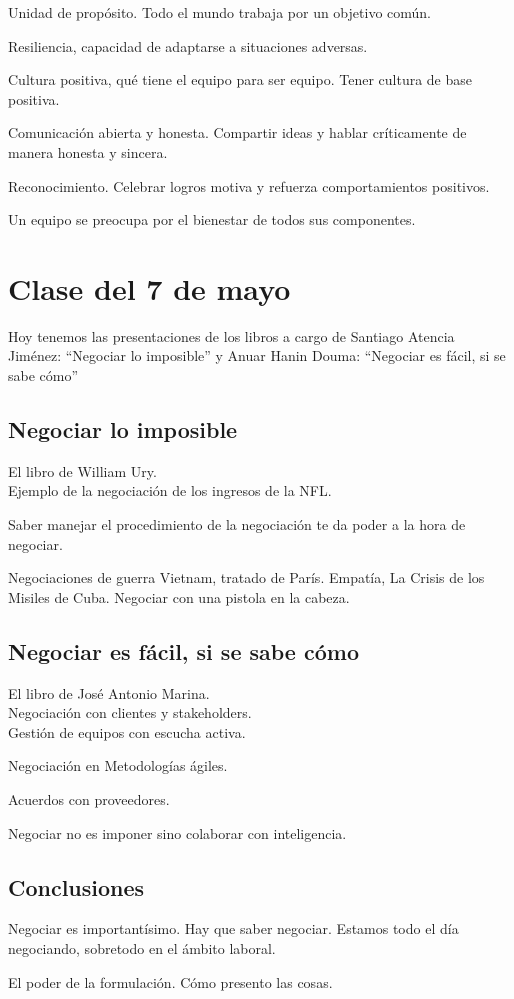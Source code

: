 \documentclass[12pt, a4paper, twoside]{article}
\begin{document}
Unidad de propósito. Todo el mundo trabaja por un objetivo común.

Resiliencia, capacidad de adaptarse a situaciones adversas.

Cultura positiva, qué tiene el equipo para ser equipo. Tener cultura de base positiva.

Comunicación abierta y honesta. Compartir ideas y hablar críticamente de manera honesta y sincera.

Reconocimiento. Celebrar logros motiva y refuerza comportamientos positivos.

Un equipo se preocupa por el bienestar de todos sus componentes.


\section{Clase del 7 de mayo}
Hoy tenemos las presentaciones de los libros a cargo de Santiago Atencia Jiménez: ``Negociar lo imposible''
y  Anuar Hanin Douma: ``Negociar es fácil, si se sabe cómo''

\subsection{Negociar lo imposible}
El libro de William Ury.\\

Ejemplo de la negociación de los ingresos de la NFL.

Saber manejar el procedimiento de la negociación te da poder a la hora de negociar.

Negociaciones de guerra Vietnam, tratado de París.
Empatía, La Crisis de los Misiles de Cuba.
Negociar con una pistola en la cabeza. 


\subsection{Negociar es fácil, si se sabe cómo}
El libro de José Antonio Marina.\\

Negociación con clientes y stakeholders.\\

Gestión de equipos con escucha activa.

Negociación en Metodologías ágiles.

Acuerdos con proveedores.

Negociar no es imponer sino colaborar con inteligencia.

\subsection{Conclusiones}

Negociar es importantísimo. Hay que saber negociar.
Estamos todo el día negociando, sobretodo en el ámbito laboral.

El poder de la formulación. Cómo presento las cosas.
\end{document}
